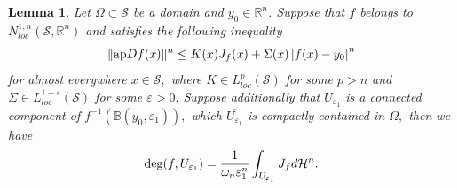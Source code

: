 \documentclass[11pt,twoside]{article}
\newtheorem{lem}[thm]{Lemma}
\theoremstyle{definition}
\theoremstyle{remark}
\newcommand{\abs}[1]{\left|#1\right|}
\begin{document}
\begin{lem}\label{lomlmass}
Let  $\Omega\subset\mathcal{S}$ be a domain and $y_{0}\in\mathbb{R}^{n}$.  Suppose that $f$ belongs to  $N_{loc}^{1,n}(\mathcal{S},\mathbb{R}^{n})$ and satisfies the following inequality
\begin{equation}
\| {\rm ap}Df(x)\|^{n}\leq K(x)J_{f}(x)+\Sigma(x)\abs{f(x)-y_{0}}^{n}
\end{equation}
for almost everywhere $x\in\mathcal{S},$ where $K\in L_{loc}^{p}(\mathcal{S})$ for some $p>n$ and  $\Sigma\in L_{loc}^{1+\varepsilon}(\mathcal{S})$ for some $\varepsilon>0.$  Suppose additionally that $U_{\varepsilon_{1}}$ is a connected component of $f^{-1}(\mathbb{B}(y_{0},\varepsilon_{1})),$ which $\overline{U_{\varepsilon_{1}}}$ is compactly contained in $\Omega,$  then we have
\begin{equation}\label{shdhjsa}
{\rm deg}(f,U_{\varepsilon_{1}})=\frac{1}{\omega_{n}\varepsilon_{1}^{n}}\int_{U_{\varepsilon_{1}}}J_{f}d\mathcal{H}^{n}.
\end{equation}
\end{lem}
\end{document}
